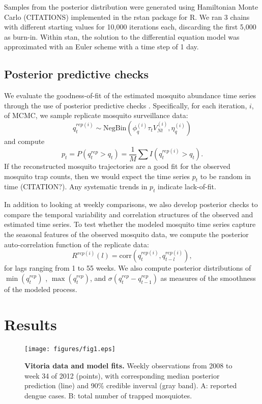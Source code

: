 \documentclass[10pt,letterpaper]{article}
\begin{document}
Samples from the posterior distribution were generated using Hamiltonian Monte Carlo (CITATIONS) implemented in the rstan package for R. 
We ran 3 chains with different starting values for 10,000 iterations each, discarding the first 5,000 as burn-in.
Within stan, the solution to the differential equation model was approximated with an Euler scheme with a time step of 1 day.  

\subsection*{Posterior predictive checks}

We evaluate the goodness-of-fit of the estimated mosquito abundance time series through the use of posterior predictive checks \cite{Gelman1996,Gelman2003}.
Specifically, for each iteration, $i$, of MCMC, we sample replicate mosquito surveillance data:
\begin{equation}
q^{rep(i)}_t \sim \text{NegBin}(\phi^{(i)}_q \tau_t V^{(i)}_{Nt}, \eta^{(i)}_q)
\end{equation}
and compute
\begin{equation}
p_t = P(q^{rep}_t > q_t) = \frac{1}{M}\sum I(q^{rep(i)}_t > q_t).
\end{equation}
If the reconstructed mosquito trajectories are a good fit for the observed mosquito trap counts, then we would expect the time series $p_t$ to be random in time (CITATION?).
Any systematic trends in $p_t$ indicate lack-of-fit.

In addition to looking at weekly comparisons, we also develop posterior checks to compare the temporal variability and correlation structures of the observed and estimated time series.
To test whether the modeled mosquito time series capture the seasonal features of the observed mosquito data, we compute the posterior auto-correlation function of the replicate data:
\begin{equation}
R^{rep(i)}(l) = \text{corr}(q^{rep(i)}_t, q^{rep(i)}_{t-l}),
\end{equation}
for lags ranging from 1 to 55 weeks.
We also compute posterior distributions of $\min(q^{rep}_t)$ , $\max(q^{rep}_t)$, and $\sigma(q^{rep}_t - q^{rep}_{t-1})$ as measures of the smoothness of the modeled process.

\section*{Results}

\begin{figure}[!h]
\texttt{[image: figures/fig1.eps]}
\caption{{\bf Vitoria data and model fits.}
Weekly observations from 2008 to week 34 of 2012 (points), with corresponding median posterior prediction (line) and 90\% credible inverval (gray band). A: reported dengue cases. B: total number of trapped mosquiotes.
}
\label{timeseries}
\end{figure}
\end{document}
